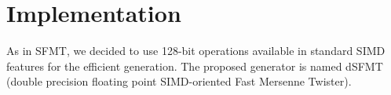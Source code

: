 \documentclass{svmult}
\begin{document}





\section{Implementation}
\label{sec:implement}

As in SFMT, we decided to use 128-bit operations available in 
standard SIMD features for the efficient generation.
The proposed generator is named dSFMT (double precision
floating point SIMD-oriented Fast Mersenne Twister).
\end{document}
